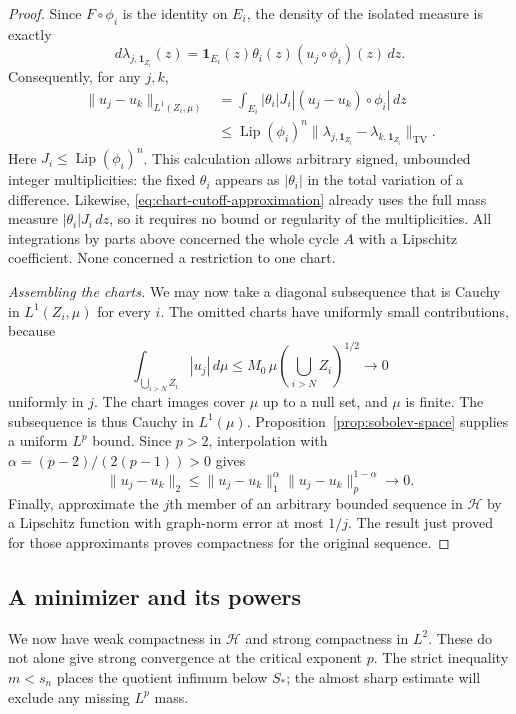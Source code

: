 \documentclass[11pt]{article}
\numberwithin{equation}{section}
\theoremstyle{definition}
\theoremstyle{remark}
\begin{document}
\begin{proof}
Since $F\circ\phi_i$ is the identity on $E_i$, the density of the
isolated measure is exactly
\[
 d\lambda_{j,\mathbf1_{Z_i}}(z)
   =\mathbf1_{E_i}(z)\theta_i(z)(u_j\circ\phi_i)(z)\,dz.
\]
Consequently, for any $j,k$,
\begin{align*}
 \|u_j-u_k\|_{L^1(Z_i,\mu)}
 &=\int_{E_i}|\theta_i|J_i
                  |(u_j-u_k)\circ\phi_i|\,dz\\
 &\le\operatorname{Lip}(\phi_i)^n
          \|\lambda_{j,\mathbf1_{Z_i}}
                    -\lambda_{k,\mathbf1_{Z_i}}\|_{\mathrm{TV}}.
\end{align*}
Here $J_i\le\operatorname{Lip}(\phi_i)^n$.  This calculation allows arbitrary
signed, unbounded integer multiplicities: the fixed $\theta_i$
appears as $|\theta_i|$ in the total variation of a difference.
Likewise, \eqref{eq:chart-cutoff-approximation} already uses the full
mass measure $|\theta_i|J_i\,dz$, so it requires no bound or regularity
of the multiplicities.  All integrations by parts above concerned
the whole cycle $A$ with a Lipschitz coefficient.  None concerned a
restriction to one chart.

\emph{Assembling the charts.}
We may now take a diagonal subsequence that is Cauchy in
$L^1(Z_i,\mu)$ for every $i$.  The omitted charts have uniformly
small contributions, because
\[
 \int_{\bigcup_{i>N}Z_i}|u_j|\,d\mu
 \le M_0\,\mu\left(\bigcup_{i>N}Z_i\right)^{1/2}
 \longrightarrow0
\]
uniformly in $j$.  The chart images cover $\mu$ up to a null set,
and $\mu$ is finite.  The subsequence is thus Cauchy in $L^1(\mu)$.
Proposition~\ref{prop:sobolev-space} supplies a uniform $L^p$ bound.
Since $p>2$, interpolation with
$\alpha=(p-2)/(2(p-1))>0$ gives
\[
 \|u_j-u_k\|_2
 \le\|u_j-u_k\|_1^\alpha\|u_j-u_k\|_p^{1-\alpha}
 \longrightarrow0.
\]
Finally, approximate the $j$th member of an arbitrary bounded
sequence in $\mathcal H$ by a Lipschitz function with graph-norm error
at most $1/j$.  The result just proved for those approximants proves
compactness for the original sequence.
\end{proof}

\subsection{A minimizer and its powers}

We now have weak compactness in $\mathcal H$ and strong compactness in
$L^2$. These do not alone give strong convergence at the critical
exponent $p$. The strict inequality $m<s_n$ places the quotient
infimum below $S_*$; the almost sharp estimate will exclude any missing
$L^p$ mass.
\end{document}
